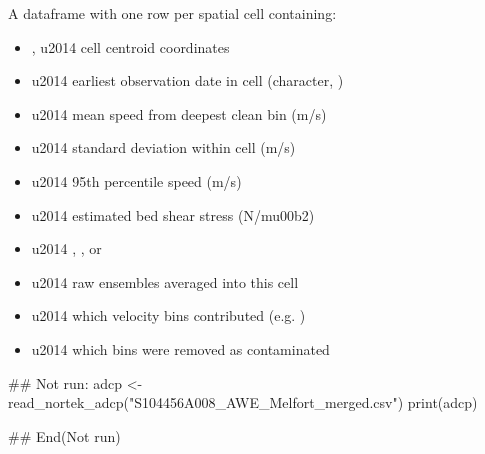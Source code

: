 \documentclass[a4paper]{book}
\begin{document}
\begin{Value}
A dataframe with one row per spatial cell containing:
\begin{itemize}

\item{} ,  \bsl{}u2014 cell centroid coordinates
\item{}  \bsl{}u2014 earliest observation date in cell (character, )
\item{}  \bsl{}u2014 mean speed from deepest clean bin (m/s)
\item{}  \bsl{}u2014 standard deviation within cell (m/s)
\item{}  \bsl{}u2014 95th percentile speed (m/s)
\item{}  \bsl{}u2014 estimated bed shear stress (N/m\bsl{}u00b2)
\item{}  \bsl{}u2014 , , or 
\item{}  \bsl{}u2014 raw ensembles averaged into this cell
\item{}  \bsl{}u2014 which velocity bins contributed (e.g. )
\item{}  \bsl{}u2014 which bins were removed as contaminated

\end{itemize}

\end{Value}
%
\begin{Examples}
\begin{ExampleCode}
## Not run: 
adcp <- read_nortek_adcp("S104456A008_AWE_Melfort_merged.csv")
print(adcp)

## End(Not run)
\end{ExampleCode}
\end{Examples}
%
\end{document}

